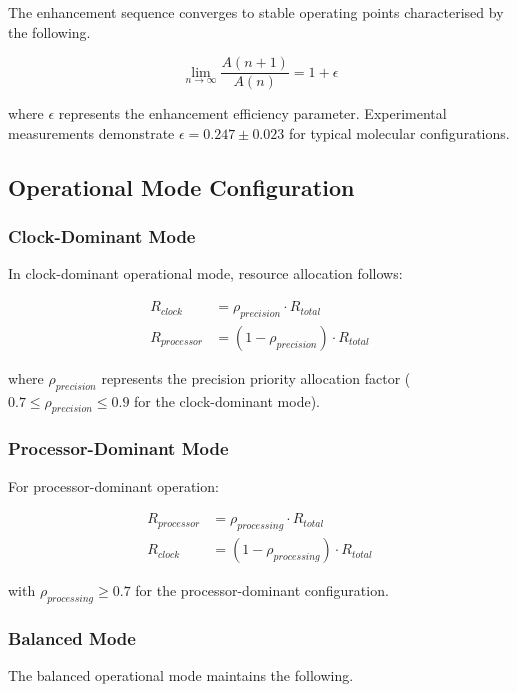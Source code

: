 \documentclass[12pt,a4paper]{article}
\begin{document}
The enhancement sequence converges to stable operating points characterised by the following.

\begin{equation}
\lim_{n \to \infty} \frac{A(n+1)}{A(n)} = 1 + \epsilon
\end{equation}

where $\epsilon$ represents the enhancement efficiency parameter. Experimental measurements demonstrate $\epsilon = 0.247 \pm 0.023$ for typical molecular configurations.

\subsection{Operational Mode Configuration}

\subsubsection{Clock-Dominant Mode}

In clock-dominant operational mode, resource allocation follows:

\begin{align}
R_{clock} &= \rho_{precision} \cdot R_{total} \\
R_{processor} &= (1 - \rho_{precision}) \cdot R_{total}
\end{align}

where $\rho_{precision}$ represents the precision priority allocation factor ($0.7 \leq \rho_{precision} \leq 0.9$ for the clock-dominant mode).

\subsubsection{Processor-Dominant Mode}

For processor-dominant operation:

\begin{align}
R_{processor} &= \rho_{processing} \cdot R_{total} \\
R_{clock} &= (1 - \rho_{processing}) \cdot R_{total}
\end{align}

with $\rho_{processing} \geq 0.7$ for the processor-dominant configuration.

\subsubsection{Balanced Mode}

The balanced operational mode maintains the following.
\end{document}
